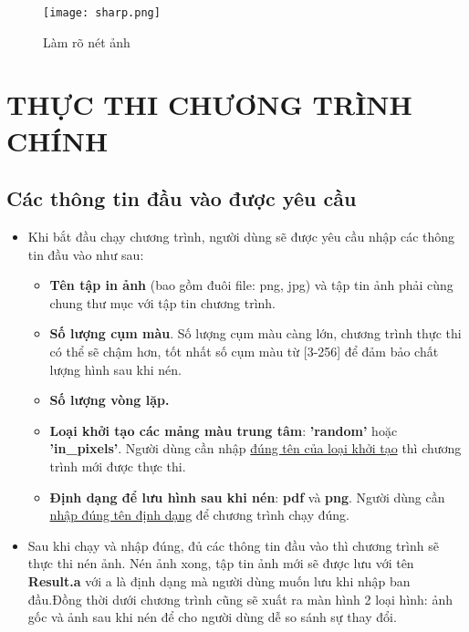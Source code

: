 \documentclass{report}
\begin{document}
\begin{enumerate}
\begin{itemize}
                \begin{figure}[!h]
                    \centering
                    \texttt{[image: sharp.png]}
                    \caption{Làm rõ nét ảnh}
                \end{figure}
            \end{itemize}
    \end{enumerate}

\newpage
\section{THỰC THI CHƯƠNG TRÌNH CHÍNH}
\subsection{Các thông tin đầu vào được yêu cầu}
\begin{itemize}
    \item Khi bắt đầu chạy chương trình, người dùng sẽ được yêu cầu nhập các thông tin đầu vào như sau:
        \begin{itemize}
            \item \textbf{Tên tập in ảnh} (bao gồm đuôi file: png, jpg) và tập tin ảnh phải cùng chung thư mục với tập tin chương trình.
            \item \textbf{Số lượng cụm màu}. Số lượng cụm màu càng lớn, chương trình thực thi có thể sẽ chậm hơn, tốt nhất số cụm màu từ [3-256] để đảm bảo chất lượng hình sau khi nén.
            \item \textbf{Số lượng vòng lặp.}
            \item \textbf{Loại khởi tạo các mảng màu trung tâm}: \textbf{'random'} hoặc \textbf{'in\_pixels'}. Người dùng cần nhập \underline{đúng tên của loại khởi tạo} thì chương trình mới được thực thi.
            \item \textbf{Định dạng để lưu hình sau khi nén}: \textbf{pdf} và \textbf{png}. Người dùng cần \underline{nhập đúng tên định dạng} để chương trình chạy đúng.
        \end{itemize}
    \item Sau khi chạy và nhập đúng, đủ các thông tin đầu vào thì chương trình sẽ thực thi nén ảnh. Nén ảnh xong, tập tin ảnh mới sẽ được lưu với tên \textbf{Result.a} với a là định dạng mà người dùng muốn lưu khi nhập ban đầu.Đồng thời dưới chương trình cũng sẽ xuất ra màn hình 2 loại hình: ảnh gốc và ảnh sau khi nén để cho người dùng dễ so sánh sự thay đổi.
    \end{itemize}
\end{document}
